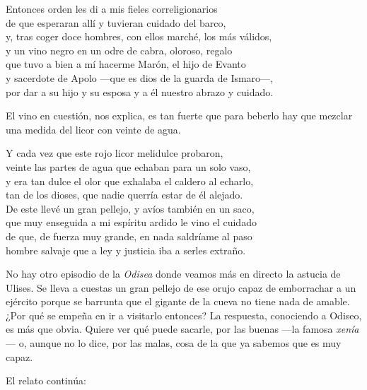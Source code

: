 \begin{versocita}
Entonces orden les di a mis fieles correligionarios\\
de que esperaran allí y tuvieran cuidado del barco,\\
y, tras coger doce hombres, con ellos marché, los más válidos,\\
y un vino negro en un odre de cabra, oloroso, regalo\\
que tuvo a bien a mí hacerme Marón, el hijo de Evanto\\
y sacerdote de Apolo ---que es dios de la guarda de Ismaro---,\\
por dar a su hijo y su esposa y a él nuestro abrazo y cuidado.
\end{versocita}

El vino en cuestión, nos explica, es tan fuerte que para beberlo hay que mezclar una medida del licor con veinte de agua.

\begin{versocita}
Y cada vez que este rojo licor melidulce probaron,\\
veinte las partes de agua que echaban para un solo vaso,\\
y era tan dulce el olor que exhalaba el caldero al echarlo,\\
tan de los dioses, que nadie querría estar de él alejado.\\
De este llevé un gran pellejo, y avíos también en un saco,\\
que muy enseguida a mi espíritu ardido le vino el cuidado\\
de que, de fuerza muy grande, en nada saldríame al paso\\
hombre salvaje que a ley y justicia iba a serles extraño.
\end{versocita}

No hay otro episodio de la \emph{Odisea} donde veamos más en directo la astucia de Ulises. Se lleva a cuestas un gran pellejo de ese orujo capaz de emborrachar a un ejército porque se barrunta que el gigante de la cueva no tiene nada de amable. ¿Por qué se empeña en ir a visitarlo entonces? La respuesta, conociendo a Odiseo, es más que obvia. Quiere ver qué puede sacarle, por las buenas ---la famosa \emph{xenía}--- o, aunque no lo dice, por las malas, cosa de la que ya sabemos que es muy capaz.

El relato continúa:

